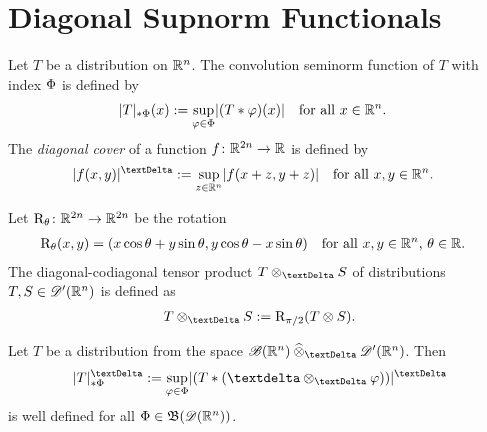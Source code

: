 \section{Diagonal Supnorm Functionals}
\label{dsnf}


Let $ T $ be a distribution on $ \mathbb{ R }^n $.
The convolution seminorm function of $ T $
with index $ \Phi $ is defined by \cite{KH022a,KH023,kle024}
\begin{align}
    \lvert  T  \rvert_{ \mathbin{*} \Phi }( x )
    &:=
    \sup_{\varphi\in\Phi}\lvert  ( T * \varphi )( x )  \rvert
    &&\text{for all $ x \in \mathbb{ R }^n $.}
\end{align}
The {\em diagonal cover} of a function $ f \colon \mathbb{ R }^{2n} \to \mathbb{ R } $
is defined by
\begin{align}
    \absDi{ f( x, y ) }
    :=
    \sup_{z\in\nrR^n}\abs{ f( x + z, y + z ) }
    &&&\text{for all $ x, y \in \nrR^n $.}
\end{align}

Let $ \mathrm{ R }_{\theta} \colon \mathbb{ R }^{2n} \to \mathbb{ R }^{2n} $ be the rotation
\begin{align}
    \mathrm{ R }_{\theta}( x, y )
    &=
    ( x\cos\theta + y\sin\theta, y\cos\theta - x\sin\theta )
    &&\text{for all $ x,y \in \mathbb{ R }^n $, $ \theta \in \mathbb{ R } $.}
\end{align}
The diagonal-codiagonal tensor product $ T \teproDi S $
of distributions $ T, S \in \mathscr{  D  }'(\mathbb{ R }^n) $ is defined as
\begin{align}
    T \teproDi S
    :=
    \rmR_{\pi/2}( T \tepro S )
    .
\end{align}

\begin{lemma}
    Let $ T $ be a distribution from the space
    $ \fsSmobnd(\nrR^n) \cteproDi \fsDis(\nrR^n) $.
    Then
    \begin{align}
        \snfDiCo{T}{\Ph}
        :=
        \sup_{ \ph \in \Ph }\abs{ ( T * ( \sfdeo \teproDi \ph ) ) }^{\tDe}
    \end{align}
    is well defined for all $ \Phi \in \operatorname{\mathfrak{ B }}(\mathscr{  D  }(\mathbb{ R }^n)) $.
\end{lemma}